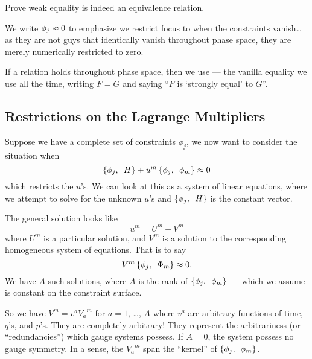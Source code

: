 \begin{xca}
  Prove weak equality is indeed an equivalence relation.
\end{xca}

\M
We write $\phi_{j}\approx0$ to emphasize we restrict focus to when the
constraints vanish\dots as they are not guys that identically vanish
throughout phase space, they are merely numerically restricted to zero.

\begin{defn}
If a relation holds throughout phase space, then we use
 --- the vanilla equality we use all the time,
writing $F=G$ and saying ``$F$ is `strongly equal' to $G$''.
\end{defn}

\subsection{Restrictions on the Lagrange Multipliers}\label{subsec:constrained-hamiltonian:restrictions-on-lagrange-multipliers}
Suppose we have a complete set of constraints $\phi_{j}$, we now want to
consider the situation when
\begin{equation}
\left\{\phi_{j},\enspace H\right\} + u^{m}\left\{\phi_{j},\enspace\phi_{m}\right\}\approx0
\end{equation}
which restricts the $u$'s. We can look at this as a system of linear
equations, where we attempt to solve for the unknown $u$'s and
$\left\{\phi_{j},\enspace H\right\}$ is the constant vector.

\label{n:constrained:generic-soln}
The general solution looks like
\begin{equation}
  u^{m} = U^{m} + V^{m}
\end{equation}
where $U^{m}$ is a particular solution, and $V^{m}$ is a solution to the
corresponding homogeneous system of equations. That is to say
\begin{equation}
V^{m}\left\{\phi_{j},\enspace\Phi_{m}\right\}\approx 0.
\end{equation}
We have $A$ such solutions, where $A$ is the rank of
$\left\{\phi_{j},\enspace\phi_{m}\right\}$ --- which we assume is constant on
the constraint surface.

So we have $V^{m}=v^{a}{V_{a}}^{m}$ for $a=1$, \dots, $A$ where $v^{a}$
are arbitrary functions of time, $q$'s, and $p$'s. They are completely
arbitrary! They represent the arbitrariness (or ``redundancies'') which
gauge systems possess. If $A=0$, the system possess no gauge
symmetry. In a sense, the ${V_{a}}^{m}$ span the ``kernel'' of
$\left\{\phi_{j},\enspace\phi_{m}\right\}$.

